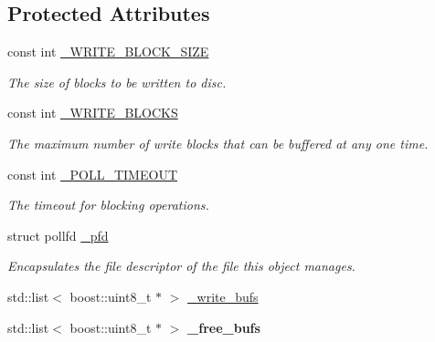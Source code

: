 \subsection*{Protected Attributes}
\begin{DoxyCompactItemize}
\item 
\hypertarget{class_file_writer_aedf3b9551969f84ce150d464cab00f84}{
const int \hyperlink{class_file_writer_aedf3b9551969f84ce150d464cab00f84}{\_\-WRITE\_\-BLOCK\_\-SIZE}}
\label{class_file_writer_aedf3b9551969f84ce150d464cab00f84}

\begin{DoxyCompactList}\small\item\em The size of blocks to be written to disc. \end{DoxyCompactList}\item 
\hypertarget{class_file_writer_a3d13acff97b66620f99bc9c6fb352f31}{
const int \hyperlink{class_file_writer_a3d13acff97b66620f99bc9c6fb352f31}{\_\-WRITE\_\-BLOCKS}}
\label{class_file_writer_a3d13acff97b66620f99bc9c6fb352f31}

\begin{DoxyCompactList}\small\item\em The maximum number of write blocks that can be buffered at any one time. \end{DoxyCompactList}\item 
\hypertarget{class_file_writer_adbde79fddb4ab604cd02dcb189f0b2fa}{
const int \hyperlink{class_file_writer_adbde79fddb4ab604cd02dcb189f0b2fa}{\_\-POLL\_\-TIMEOUT}}
\label{class_file_writer_adbde79fddb4ab604cd02dcb189f0b2fa}

\begin{DoxyCompactList}\small\item\em The timeout for blocking operations. \end{DoxyCompactList}\item 
\hypertarget{class_file_writer_a823e30da8d24cec85a15bb8947ec7d26}{
struct pollfd \hyperlink{class_file_writer_a823e30da8d24cec85a15bb8947ec7d26}{\_\-pfd}}
\label{class_file_writer_a823e30da8d24cec85a15bb8947ec7d26}

\begin{DoxyCompactList}\small\item\em Encapsulates the file descriptor of the file this object manages. \end{DoxyCompactList}\item 
std::list$<$ boost::uint8\_\-t $\ast$ $>$ \hyperlink{class_file_writer_aca52ee3a5dcc8649a1aa702ba6de6af6}{\_\-write\_\-bufs}
\item 
\hypertarget{class_file_writer_a5f1926d606cd889230ca72241e57dffc}{
std::list$<$ boost::uint8\_\-t $\ast$ $>$ {\bfseries \_\-free\_\-bufs}}
\label{class_file_writer_a5f1926d606cd889230ca72241e57dffc}


\end{DoxyCompactItemize}
